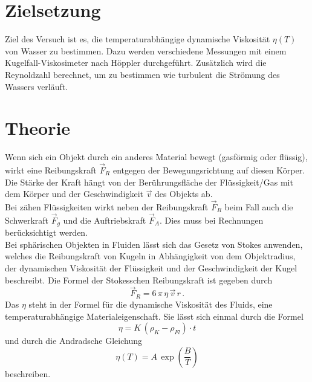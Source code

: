 \section{Zielsetzung}
    \label{sec:Zielsetzung}

    Ziel des Versuch ist es, die temperaturabhängige dynamische Viskosität $\eta(T)$ von Wasser zu bestimmen. Dazu werden verschiedene Messungen
    mit einem Kugelfall-Viskosimeter nach Höppler durchgeführt. Zusätzlich wird die Reynoldzahl berechnet, um zu bestimmen wie turbulent die Strömung
    des Wassers verläuft.

    \newpage

\section{Theorie}
    \label{sec:Theorie}
    Wenn sich ein Objekt durch ein anderes Material bewegt (gasförmig oder flüssig), wirkt eine Reibungskraft $\vec{F}_R$ entgegen der
    Bewegungsrichtung auf diesen Körper. Die Stärke der Kraft hängt von der Berührungsfläche der Flüssigkeit/Gas mit dem Körper und der
    Geschwindigkeit $\vec{v}$ des Objekts ab. \\
    Bei zähen Flüssigkeiten wirkt neben der Reibungskraft $\vec{F}_R$ beim Fall auch die Schwerkraft $\vec{F}_g$ und die Auftriebskraft $\vec{F}_A$. Dies 
    muss bei Rechnungen berücksichtigt werden.\\
    Bei sphärischen Objekten in Fluiden lässt sich das Gesetz von Stokes anwenden, welches die Reibungskraft von Kugeln in Abhängigkeit von dem Objektradius,
    der dynamischen Viskosität der Flüssigkeit und der Geschwindigkeit der Kugel beschreibt. Die Formel der Stokesschen Reibungskraft ist gegeben durch
    \begin{equation}
        \label{eqn:Stokes}
        \vec{F}_R = 6 \, \pi \, \eta \, \vec{v} \, r \, .
    \end{equation}
    Das $\eta$ steht in der Formel für die dynamische Viskosität des Fluids, eine temperaturabhängige Materialeigenschaft. Sie lässt sich einmal durch die Formel
    \begin{equation}
        \label{eqn:etaK}
        \eta = K \, (\rho_K - \rho_{Fl}) \cdot t
    \end{equation}
    und durch die Andradsche Gleichung
    \begin{equation}
        \label{eqn:Andrad}
        \eta(T) = A \, \exp{\left(\frac{B}{T}\right)}
    \end{equation}
    beschreiben.\\
